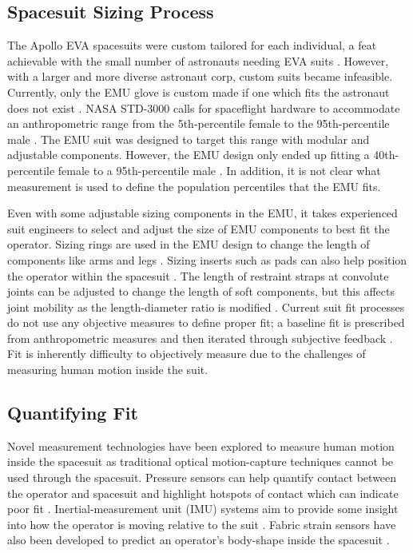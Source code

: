 \documentclass[defaultstyle,11pt]{comps}
\begin{document}
\hypertarget{spacesuit-sizing-process}{%
\subsection{Spacesuit Sizing Process}\label{spacesuit-sizing-process}}

The Apollo EVA spacesuits were custom tailored for each individual, a feat achievable with the small number of astronauts needing EVA suits \citep{Harris2001}.
However, with a larger and more diverse astronaut corp, custom suits became infeasible.
Currently, only the EMU glove is custom made if one which fits the astronaut does not exist \citep{Chappell2017}.
NASA STD-3000 calls for spaceflight hardware to accommodate an anthropometric range from the 5th-percentile female to the 95th-percentile male \citep{NASA1995}.
The EMU suit was designed to target this range with modular and adjustable components.
However, the EMU design only ended up fitting a 40th-percentile female to a 95th-percentile male \citep{Kim2019}.
In addition, it is not clear what measurement is used to define the population percentiles that the EMU fits.

Even with some adjustable sizing components in the EMU, it takes experienced suit engineers to select and adjust the size of EMU components to best fit the operator.
Sizing rings are used in the EMU design to change the length of components like arms and legs \citep{Harris2001}.
Sizing inserts such as pads can also help position the operator within the spacesuit \citep{Chappell2017}.
The length of restraint straps at convolute joints can be adjusted to change the length of soft components, but this affects joint mobility as the length-diameter ratio is modified \citep{Harris2001}.
Current suit fit processes do not use any objective measures to define proper fit; a baseline fit is prescribed from anthropometric measures and then iterated through subjective feedback \citep{Fineman2017}.
Fit is inherently difficulty to objectively measure due to the challenges of measuring human motion inside the suit.

\hypertarget{quantifying-fit}{%
\subsection{Quantifying Fit}\label{quantifying-fit}}

Novel measurement technologies have been explored to measure human motion inside the spacesuit as traditional optical motion-capture techniques cannot be used through the spacesuit.
Pressure sensors can help quantify contact between the operator and spacesuit and highlight hotspots of contact which can indicate poor fit \citep{Anderson2014}.
Inertial-measurement unit (IMU) systems aim to provide some insight into how the operator is moving relative to the suit \citep{Bertrand2016, Fineman2018, Shen2019}.
Fabric strain sensors have also been developed to predict an operator's body-shape inside the spacesuit \citep{Kim2019}.
\end{document}

